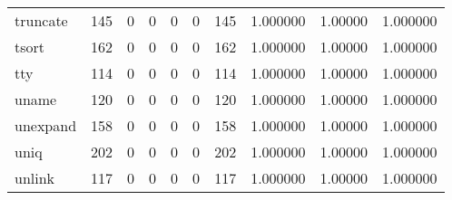 \begin{longtable}{lrrrrrrrrr}
truncate  &                    145 &                                  0 &                                 0 &                                0 &                                 0 &                             145 &                                1.000000 &                                1.00000 &                             1.000000 \\
tsort     &                    162 &                                  0 &                                 0 &                                0 &                                 0 &                             162 &                                1.000000 &                                1.00000 &                             1.000000 \\
tty       &                    114 &                                  0 &                                 0 &                                0 &                                 0 &                             114 &                                1.000000 &                                1.00000 &                             1.000000 \\
uname     &                    120 &                                  0 &                                 0 &                                0 &                                 0 &                             120 &                                1.000000 &                                1.00000 &                             1.000000 \\
unexpand  &                    158 &                                  0 &                                 0 &                                0 &                                 0 &                             158 &                                1.000000 &                                1.00000 &                             1.000000 \\
uniq      &                    202 &                                  0 &                                 0 &                                0 &                                 0 &                             202 &                                1.000000 &                                1.00000 &                             1.000000 \\
unlink    &                    117 &                                  0 &                                 0 &                                0 &                                 0 &                             117 &                                1.000000 &                                1.00000 &                             1.000000 \\

\end{longtable}
